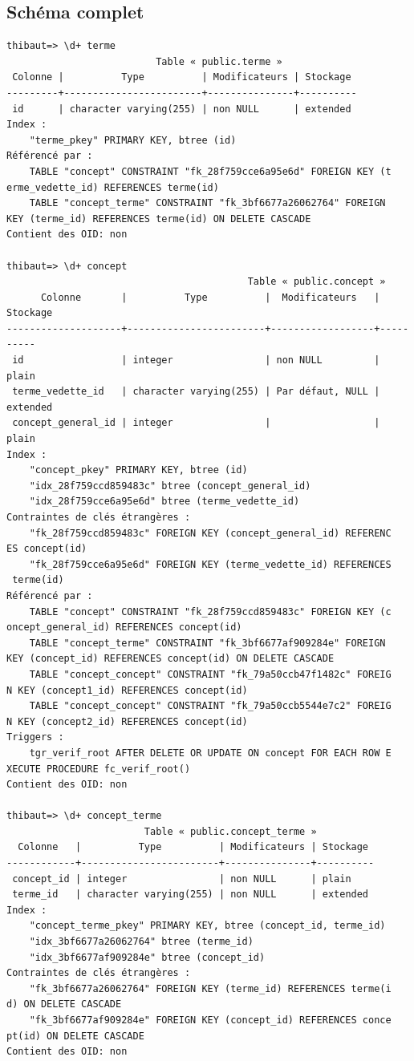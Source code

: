 \subsection{Schéma complet}
\begin{verbatim}
thibaut=> \d+ terme
                          Table « public.terme »
 Colonne |          Type          | Modificateurs | Stockage 
---------+------------------------+---------------+----------
 id      | character varying(255) | non NULL      | extended  
Index :
    "terme_pkey" PRIMARY KEY, btree (id)
Référencé par :
    TABLE "concept" CONSTRAINT "fk_28f759cce6a95e6d" FOREIGN KEY (t
erme_vedette_id) REFERENCES terme(id)
    TABLE "concept_terme" CONSTRAINT "fk_3bf6677a26062764" FOREIGN 
KEY (terme_id) REFERENCES terme(id) ON DELETE CASCADE
Contient des OID: non

thibaut=> \d+ concept
                                          Table « public.concept »
      Colonne       |          Type          |  Modificateurs   | Stockage  
--------------------+------------------------+------------------+----------
 id                 | integer                | non NULL         | plain    
 terme_vedette_id   | character varying(255) | Par défaut, NULL | extended
 concept_general_id | integer                |                  | plain     
Index :
    "concept_pkey" PRIMARY KEY, btree (id)
    "idx_28f759ccd859483c" btree (concept_general_id)
    "idx_28f759cce6a95e6d" btree (terme_vedette_id)
Contraintes de clés étrangères :
    "fk_28f759ccd859483c" FOREIGN KEY (concept_general_id) REFERENC
ES concept(id)
    "fk_28f759cce6a95e6d" FOREIGN KEY (terme_vedette_id) REFERENCES
 terme(id)
Référencé par :
    TABLE "concept" CONSTRAINT "fk_28f759ccd859483c" FOREIGN KEY (c
oncept_general_id) REFERENCES concept(id)
    TABLE "concept_terme" CONSTRAINT "fk_3bf6677af909284e" FOREIGN 
KEY (concept_id) REFERENCES concept(id) ON DELETE CASCADE
    TABLE "concept_concept" CONSTRAINT "fk_79a50ccb47f1482c" FOREIG
N KEY (concept1_id) REFERENCES concept(id)
    TABLE "concept_concept" CONSTRAINT "fk_79a50ccb5544e7c2" FOREIG
N KEY (concept2_id) REFERENCES concept(id)
Triggers :
    tgr_verif_root AFTER DELETE OR UPDATE ON concept FOR EACH ROW E
XECUTE PROCEDURE fc_verif_root()
Contient des OID: non

thibaut=> \d+ concept_terme
                        Table « public.concept_terme »
  Colonne   |          Type          | Modificateurs | Stockage 
------------+------------------------+---------------+----------
 concept_id | integer                | non NULL      | plain     
 terme_id   | character varying(255) | non NULL      | extended  
Index :
    "concept_terme_pkey" PRIMARY KEY, btree (concept_id, terme_id)
    "idx_3bf6677a26062764" btree (terme_id)
    "idx_3bf6677af909284e" btree (concept_id)
Contraintes de clés étrangères :
    "fk_3bf6677a26062764" FOREIGN KEY (terme_id) REFERENCES terme(i
d) ON DELETE CASCADE
    "fk_3bf6677af909284e" FOREIGN KEY (concept_id) REFERENCES conce
pt(id) ON DELETE CASCADE
Contient des OID: non


\end{verbatim}
